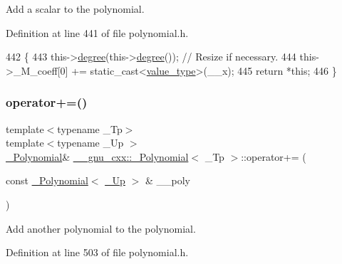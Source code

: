 Add a scalar to the polynomial. 

Definition at line 441 of file polynomial.\+h.


\begin{DoxyCode}
442         \{
443           this->\hyperlink{class____gnu__cxx_1_1__Polynomial_a07d9933aeeb9afbd823218ed921336cb}{degree}(this->\hyperlink{class____gnu__cxx_1_1__Polynomial_a07d9933aeeb9afbd823218ed921336cb}{degree}()); \textcolor{comment}{// Resize if necessary.}
444           this->\_M\_coeff[0] += \textcolor{keyword}{static\_cast<}\hyperlink{class____gnu__cxx_1_1__Polynomial_a725563351f50e76084a7a016c06f8a53}{value\_type}\textcolor{keyword}{>}(\_\_x);
445           \textcolor{keywordflow}{return} *\textcolor{keyword}{this};
446         \}
\end{DoxyCode}
\mbox{\label{class____gnu__cxx_1_1__Polynomial_ac7b0aafe9829a3eae65f79a99881fac2}} 
\subsubsection{\texorpdfstring{operator+=()}{operator+=()}\hspace{0.1cm}{\footnotesize\ttfamily [2/2]}}
{\footnotesize\ttfamily template$<$typename \+\_\+\+Tp$>$ \\
template$<$typename \+\_\+\+Up $>$ \\
\hyperlink{class____gnu__cxx_1_1__Polynomial}{\+\_\+\+Polynomial}\& \hyperlink{class____gnu__cxx_1_1__Polynomial}{\+\_\+\+\_\+gnu\+\_\+cxx\+::\+\_\+\+Polynomial}$<$ \+\_\+\+Tp $>$\+::operator+= (\begin{DoxyParamCaption}\item[{const \hyperlink{class____gnu__cxx_1_1__Polynomial}{\+\_\+\+Polynomial}$<$ \hyperlink{class____gnu__cxx_1_1__Polynomial_a242114d4b86648a5dff67a8221f80d40}{\+\_\+\+Up} $>$ \&}]{\+\_\+\+\_\+poly }\end{DoxyParamCaption})\hspace{0.3cm}{\ttfamily [inline]}}

Add another polynomial to the polynomial. 

Definition at line 503 of file polynomial.\+h.


